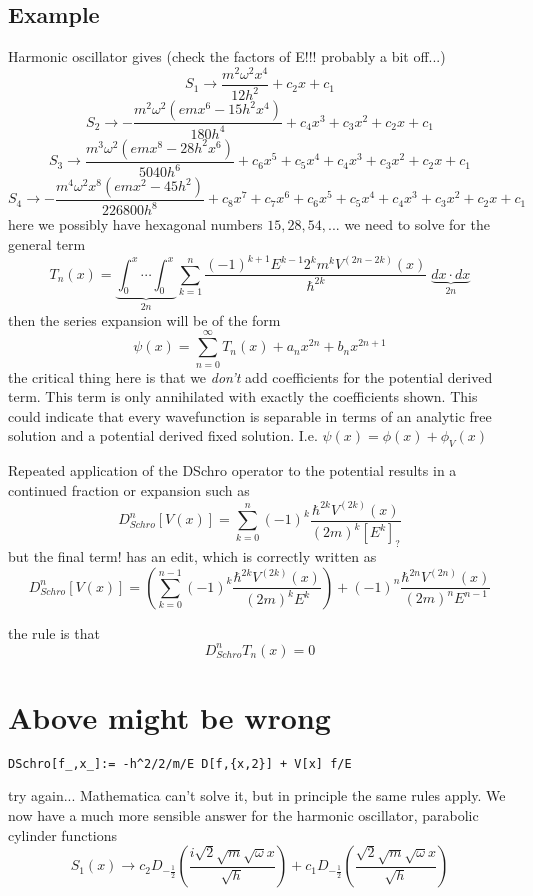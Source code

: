 \documentclass{article}
\begin{document}
\subsection{Example}
Harmonic oscillator gives (check the factors of E!!! probably a bit off...)
$$
S_1 \to \frac{m^2 \omega ^2 x^4}{12 h^2}+c_2 x+c_1
$$
$$
S_2 \to -\frac{ m^2 \omega ^2 \left(e m x^6-15 h^2 x^4\right)}{180 h^4}+c_4 x^3+c_3 x^2+c_2 x + c_1
$$
$$
S_3 \to \frac{ m^3 \omega ^2 \left(e m x^8-28 h^2 x^6\right)}{5040 h^6}+c_6 x^5+c_5 x^4+c_4 x^3+c_3 x^2+c_2 x+c_1
$$
$$
S_4 \to  -\frac{m^4 \omega ^2 x^8 \left(e m x^2-45 h^2\right)}{226800 h^8}+c_8 x^7+c_7 x^6+c_6 x^5+c_5 x^4+c_4 x^3+c_3 x^2+c_2 x+c_1
$$
here we possibly have hexagonal numbers $15,28,54,...$ we need to solve for the general term
$$
T_n(x) = \underbrace{\int_0^x \cdots \int_0^x}_{2n} \sum_{k=1}^n \frac{(-1)^{k+1} E^{k-1} 2^k m^k V^{(2n-2k)}(x)}{\hbar^{2k}}  \; \underbrace{dx \cdot dx}_{2n}
$$
then the series expansion will be of the form 
$$
\psi(x) = \sum_{n=0}^\infty T_n(x) + a_n x^{2n} + b_n x^{2n+1}
$$
the critical thing here is that we \emph{don't} add coefficients for the potential derived term. This term is only annihilated with exactly the coefficients shown. This could indicate that every wavefunction is separable in terms of an analytic free solution and a potential derived fixed solution. I.e. $\psi(x) = \phi(x) + \phi_V(x)$

Repeated application of the DSchro operator to the potential results in a continued fraction or expansion such as 
$$
D^n_{Schro}[V(x)] = \sum_{k=0}^n (-1)^k \frac{\hbar^{2k} V^{(2k)}(x)}{(2m)^k [E^k]_?}
$$
but the final term! has an edit, which is correctly written as
$$
D^n_{Schro}[V(x)] = \left(\sum_{k=0}^{n-1} (-1)^k \frac{\hbar^{2k} V^{(2k)}(x)}{(2m)^k E^k}\right) + (-1)^n \frac{\hbar^{2n} V^{(2n)}(x)}{(2m)^n E^{n-1}}
$$

the rule is that 
$$
D_{Schro}^n T_n(x) = 0
$$

\section{Above might be wrong}
\begin{verbatim}
DSchro[f_,x_]:= -h^2/2/m/E D[f,{x,2}] + V[x] f/E
\end{verbatim}
try again... Mathematica can't solve it, but in principle the same rules apply. We now have a much more sensible answer for the harmonic oscillator, parabolic cylinder functions
$$
S_1(x) \to c_2 D_{-\frac{1}{2}}\left(\frac{i \sqrt{2} \sqrt{m} \sqrt{\omega } x}{\sqrt{h}}\right)+c_1 D_{-\frac{1}{2}}\left(\frac{\sqrt{2} \sqrt{m} \sqrt{\omega } x}{\sqrt{h}}\right)
$$
\end{document}
